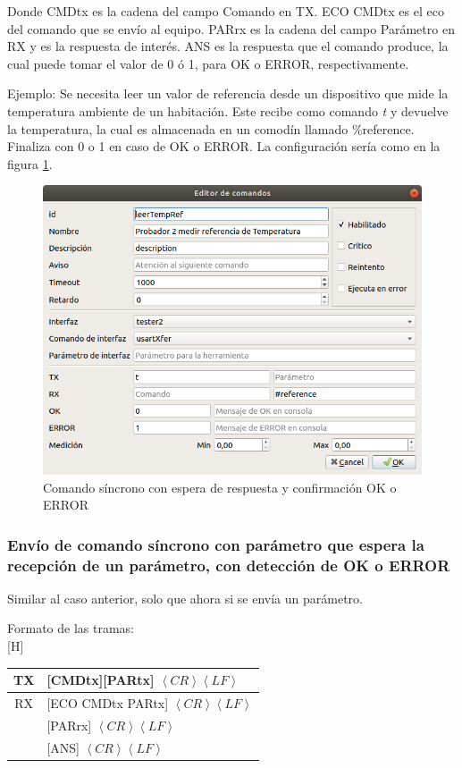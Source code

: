 \documentclass[a4paper,12pt]{refart}
\makeatletter
\renewenvironment{table}%
  {\renewcommand\familydefault\sfdefault
   \@float{table}}
  {\end@float}
\makeatother
\begin{document}
Donde CMDtx es la cadena del campo Comando en TX. ECO CMDtx es el eco del comando que se envío al equipo. PARrx es la cadena del campo Parámetro en RX y es la respuesta de interés. ANS es la respuesta que el comando produce, la cual puede tomar el valor de 0 ó 1, para OK o ERROR, respectivamente.

Ejemplo: Se necesita leer un valor de referencia desde un dispositivo que mide la temperatura ambiente de un habitación. Este recibe como comando \textit{t} y devuelve la temperatura, la cual es almacenada en un comodín llamado \%reference. Finaliza con 0 o 1 en caso de OK o ERROR. La configuración sería como en la figura \ref{fig:commands3}.

\begin{figure}[H]\centering
\includegraphics[scale=0.4, frame]{images/commands3} 
\caption{Comando síncrono con espera de respuesta y confirmación OK o ERROR}
\label{fig:commands3}
\end{figure}

\subsubsection{Envío de comando síncrono con parámetro que espera la recepción de un parámetro, con detección de OK o ERROR}
Similar al caso anterior, solo que ahora si se envía un parámetro.

Formato de las tramas:
\\
\begin{table}[H]
\small\centering
\begin{tabular}{|c|l|}
\hline
TX & [CMDtx][PARtx] $\left\langle CR \right\rangle \left\langle LF \right\rangle$ \\
\hline 
RX & [ECO CMDtx PARtx] $\left\langle CR \right\rangle \left\langle LF \right\rangle$ \\
   & [PARrx] $\left\langle CR \right\rangle \left\langle LF \right\rangle$ \\
   & [ANS] $\left\langle CR \right\rangle \left\langle LF \right\rangle$ \\ 
\hline
\end{tabular} 
\end{table}
\end{document}
